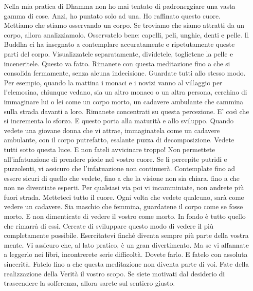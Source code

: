 Nella mia pratica di Dhamma non ho mai tentato di padroneggiare una
vasta gamma di cose. Anzi, ho puntato solo ad una. Ho raffinato questo
cuore. Mettiamo che stiamo osservando un corpo. Se troviamo che siamo
attratti da un corpo, allora analizziamolo. Osservatelo bene: capelli,
peli, unghie, denti e pelle.%
Il Buddha ci ha
insegnato a contemplare accuratamente e ripetutamente queste parti del
corpo. Visualizzatele separatamente, dividetele, toglietene la pelle e
inceneritele. Questo va fatto. Rimanete con questa meditazione fino a
che si consolida fermamente, senza alcuna indecisione. Guardate tutti
allo stesso modo. Per esempio, quando la mattina i monaci e i novizi
vanno al villaggio per l'elemosina, chiunque vedano, sia un altro monaco
o un altra persona, cerchino di immaginare lui o lei come un corpo
morto, un cadavere ambulante che cammina sulla strada davanti a loro.
Rimanete concentrati su questa percezione. E' così che si incrementa lo
sforzo. E questo porta alla maturità e allo sviluppo. Quando vedete una
giovane donna che vi attrae, immaginatela come un cadavere ambulante,
con il corpo putrefatto, esalante puzza di decomposizione. Vedete tutti
sotto questa luce. E non fateli avvicinare troppo! Non permettete
all'infatuazione di prendere piede nel vostro cuore. Se li percepite
putridi e puzzolenti, vi assicuro che l'infatuazione non continuerà.
Contemplate fino ad essere sicuri di quello che vedete, fino a che la
visione non sia chiara, fino a che non ne diventiate esperti. Per
qualsiasi via poi vi incamminiate, non andrete più fuori strada.
Metteteci tutto il cuore. Ogni volta che vedete qualcuno, sarà come
vedere un cadavere. Sia maschio che femmina, guardatene il corpo come se
fosse morto. E non dimenticate di vedere il vostro come morto. In fondo
è tutto quello che rimarrà di essi. Cercate di sviluppare questo modo di
vedere il più completamente possibile. Esercitatevi finché diventa
sempre più parte della vostra mente. Vi assicuro che, al lato pratico, è
un gran divertimento. Ma se vi affannate a leggerlo nei libri,
incontrerete serie difficoltà. Dovete farlo. E fatelo con assoluta
sincerità. Fatelo fino a che questa meditazione non diventa parte di
voi. Fate della realizzazione della Verità il vostro scopo. Se siete
motivati dal desiderio di trascendere la sofferenza, allora sarete sul
sentiero giusto.

